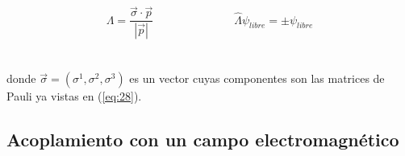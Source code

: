 \documentclass[11pt,letterpaper]{article}     %
\begin{document}
\begin{equation} \label{eq:59}
\Lambda = \frac{\vec{\sigma} \cdot \vec{p}}{|\vec{p}|} \hspace{3cm} \hat{\Lambda} \psi_{libre} = \pm  \psi_{libre}
\end{equation} \\ \\
donde $\vec{\sigma}=(\sigma^1,\sigma^2,\sigma^3)$ es un vector cuyas componentes son las matrices de Pauli ya vistas en (\ref{eq:28}).






\subsection{Acoplamiento con un campo electromagnético} %
\end{document}
